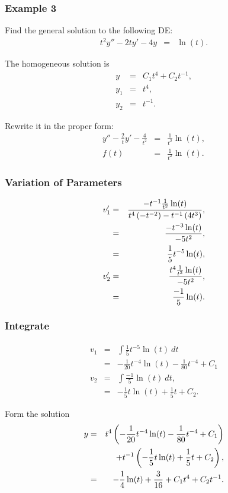 \begin{frame}
  \frametitle{Example 3}
  Find the general solution to the following DE:
  \begin{eqnarray*}
    t^2 y'' - 2t y' - 4y & = & \ln(t).
  \end{eqnarray*}

  {

    The homogeneous solution is 
    \begin{eqnarray*}
      y & = & C_1 t^4 + C_2 t^{-1}, \\
      y_1 & = & t^4, \\
      y_2 & = & t^{-1}.
    \end{eqnarray*}

    Rewrite it in the proper form:
    \begin{eqnarray*}
      y'' - \frac{2}{t} y' - \frac{4}{t^2} & = & \frac{1}{t^2} \ln(t), \\
      f(t) & = & \frac{1}{t^2} \ln(t).
    \end{eqnarray*}

  }
\end{frame}

\begin{frame}
  \frametitle{Variation of Parameters}

  \begin{eqnarray*}
    v_1' & = & \frac{-t^{-1}\frac{1}{t^2}\ln(t)}{t^4 \left( -t^{-2} \right) - t^{-1} \left( 4 t^3 \right)}, \\
    & = & \frac{-t^{-3}\ln(t)}{-5t^2}, \\
    & = & \frac{1}{5} t^{-5} \ln(t), \\
    v_2' & = & \frac{t^4 \frac{1}{t^2} \ln(t)}{-5t^2}, \\
    & = & \frac{-1}{5} \ln(t).
  \end{eqnarray*}
  

\end{frame}

\begin{frame}
  \frametitle{Integrate}

  \begin{eqnarray*}
    v_1 & = & \int \frac{1}{5} t^{-5} \ln(t) ~ dt  \\
    & = & -\frac{1}{20} t^{-4} \ln(t) - \frac{1}{80} t^{-4} + C_1 \\
    v_2 & = & \int \frac{-1}{5} \ln(t) ~ dt, \\
    & = & -\frac{1}{5} t \ln(t) + \frac{1}{5} t + C_2.
  \end{eqnarray*}

  Form the solution
  \begin{eqnarray*}
    y & = & t^4 \left( -\frac{1}{20} t^{-4} \ln(t) - \frac{1}{80} t^{-4} + C_1 \right) \\
    & & + t^{-1} \left( -\frac{1}{5} t \ln(t) + \frac{1}{5} t + C_2 \right), \\
    & = & -\frac{1}{4} \ln(t) + \frac{3}{16} + C_1 t^4 + C_2 t^{-1}.
  \end{eqnarray*}

\end{frame}



